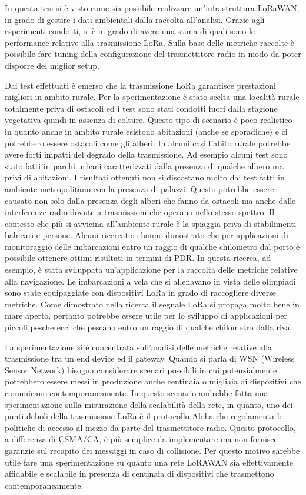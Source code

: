 \documentclass[12pt,a4paper,openright,twoside]{report}
\begin{document}
In questa tesi si \`e visto come sia possibile realizzare un'infrastruttura LoRaWAN, in grado di gestire i dati ambientali dalla raccolta all'analisi. 
Grazie agli esperimenti condotti, si \`e in grado di avere una stima di quali sono le performance relative alla trasmissione LoRa. Sulla base delle metriche raccolte \`e possibile fare tuning della configurazione del trasmettitore radio in modo da poter disporre del miglior setup.  

Dai test effettuati \`e emerso che la trasmissione LoRa garantisce prestazioni migliori in ambito rurale. Per la sperimentazione \`e stato scelta una localit\`a rurale totalmente priva di ostacoli ed i test sono stati condotti fuori dalla stagione vegetativa quindi in assenza di colture. Questo tipo di scenario \`e poco realistico in quanto anche in ambito rurale esistono abitazioni (anche se sporadiche) e ci potrebbero essere ostacoli come gli alberi. 
In alcuni casi l'abito rurale potrebbe avere forti impatti del degrado della trasmissione. Ad esempio alcuni test sono stato fatti in parchi urbani caratterizzati dalla presenza di qualche albero ma privi di abitazioni. I risultati ottenuti non si discostano molto dai test fatti in ambiente metropolitano con la presenza di palazzi. Questo potrebbe essere causato non solo dalla presenza degli alberi che fanno da ostacoli ma anche dalle interferenze radio dovute a trasmissioni che operano nello stesso spettro.  
Il contesto che pi\`u si avvicina all'ambiente rurale \`e la spiaggia priva di stabilimenti balneari e persone. Alcuni ricercatori hanno dimostrato \cite{K28} che per applicazioni di monitoraggio delle imbarcazioni entro un raggio di qualche chilometro dal porto \`e possibile ottenere ottimi risultati in termini di PDR. In questa ricerca, ad esempio, \`e stata sviluppata un'applicazione per la raccolta delle metriche relative alla navigazione. Le imbarcazioni a vela che si allenavano in vista delle olimpiadi sono state equipaggiate con dispositivi LoRa in grado di raccogliere diverse metriche. Come dimostrato nella ricerca il segnale LoRa si propaga molto bene in mare aperto, pertanto potrebbe essere utile per lo sviluppo di applicazioni per piccoli pescherecci che pescano entro un raggio di qualche chilometro dalla riva.  

La sperimentazione si \`e concentrata sull'analisi delle metriche relative alla trasmissione tra un end device ed il gateway. Quando si parla di WSN (Wireless Sensor Network) bisogna considerare scenari possibili in cui potenzialmente potrebbero essere messi in produzione anche centinaia o migliaia di dispositivi che comunicano contemporaneamente. 
In questo scenario andrebbe fatta una sperimentazione sulla misurazione della scalabilit\`a della rete, in quanto, uno dei punti deboli della trasmissione LoRa \`e il protocollo Aloha che regolamenta le politiche di accesso al mezzo da parte del trasmettitore radio. 
Questo protocollo, a differenza di CSMA/CA, \`e pi\`u semplice da implementare ma non fornisce garanzie sul recapito dei messaggi in caso di collisione. Per questo motivo sarebbe utile fare una sperimentazione su quanto una rete LoRAWAN sia effettivamente affidabile e scalabile in presenza di centinaia di dispositivi che trasmettono contemporaneamente.   
\end{document}
